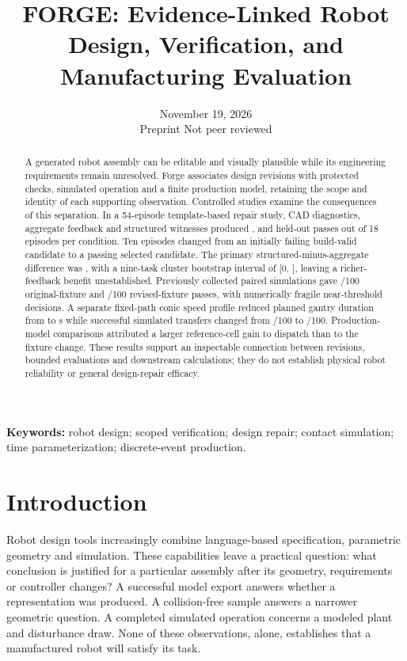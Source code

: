 

\title{FORGE: Evidence-Linked Robot Design, Verification, and Manufacturing Evaluation}
\author{\authorblock}
\date{November 19, 2026\\\small Preprint \textperiodcentered{} Not peer reviewed}

\maketitle
\begin{abstract}
A generated robot assembly can be editable and visually plausible while its engineering requirements remain unresolved. Forge associates design revisions with protected checks, simulated operation and a finite production model, retaining the scope and identity of each supporting observation. Controlled studies examine the consequences of this separation. In a 54-episode template-based repair study, CAD diagnostics, aggregate feedback and structured witnesses produced \EOneCadPass{}, \EOneAggregatePass{} and \EOneStructuredPass{} held-out passes out of 18 episodes per condition. Ten episodes changed from an initially failing build-valid candidate to a passing selected candidate. The primary structured-minus-aggregate difference was \EOnePrimaryRounded{}, with a nine-task cluster bootstrap interval of [0, \EOnePrimaryHighRounded{}], leaving a richer-feedback benefit unestablished. Previously collected paired simulations gave \ETwoReferenceOriginal{}/100 original-fixture and \ETwoReferenceRevised{}/100 revised-fixture passes, with numerically fragile near-threshold decisions. A separate fixed-path conic speed profile reduced planned gantry duration from \GantryBaselineTime{} to \GantryOptimisedTime{} s while successful simulated transfers changed from \GantryBaselinePass{}/100 to \GantryOptimisedPass{}/100. Production-model comparisons attributed a larger reference-cell gain to dispatch than to the fixture change. These results support an inspectable connection between revisions, bounded evaluations and downstream calculations; they do not establish physical robot reliability or general design-repair efficacy.
\end{abstract}
\noindent\textbf{Keywords:} robot design; scoped verification; design repair; contact simulation; time parameterization; discrete-event production.

\section{Introduction}
Robot design tools increasingly combine language-based specification, parametric geometry and simulation. These capabilities leave a practical question: what conclusion is justified for a particular assembly after its geometry, requirements or controller changes? A successful model export answers whether a representation was produced. A collision-free sample answers a narrower geometric question. A completed simulated operation concerns a modeled plant and disturbance draw. None of these observations, alone, establishes that a manufactured robot will satisfy its task.

